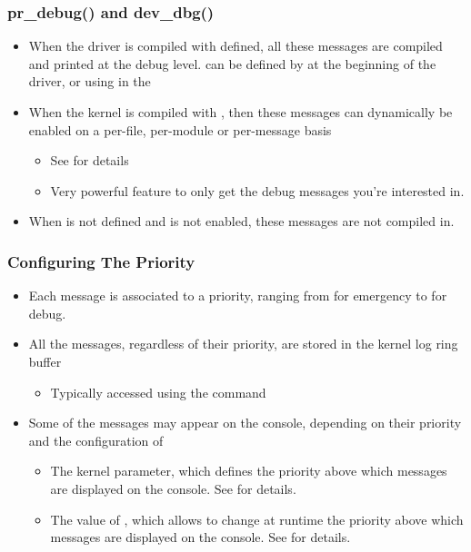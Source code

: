 \begin{frame}
  \frametitle{pr\_debug() and dev\_dbg()}
  \begin{itemize}
  \item When the driver is compiled with  defined, all
    these messages are compiled and printed at the debug level.
     can be defined by  at the
    beginning of the driver, or using
     in the 
  \item When the kernel is compiled with ,
    then these messages can dynamically be enabled on a per-file,
    per-module or per-message basis
    \begin{itemize}
    \item See  for details
    \item Very powerful feature to only get the debug messages you're
      interested in.
    \end{itemize}
  \item When  is not defined and
     is not enabled, these messages are not
    compiled in.
  \end{itemize}
\end{frame}

\begin{frame}
  \frametitle{Configuring The Priority}
  \begin{itemize}
  \item Each message is associated to a priority, ranging from  for
    emergency to  for debug.
  \item All the messages, regardless of their priority, are stored in
    the kernel log ring buffer
    \begin{itemize}
    \item Typically accessed using the  command
    \end{itemize}
  \item Some of the messages may appear on the console, depending on
    their priority and the configuration of
    \begin{itemize}
    \item The  kernel parameter, which defines the
      priority above which messages are displayed on the console. See
       for details.
    \item The value of , which allows to
      change at runtime the priority above which messages are
      displayed on the console. See
       for details.
    \end{itemize}
  \end{itemize}
\end{frame}


